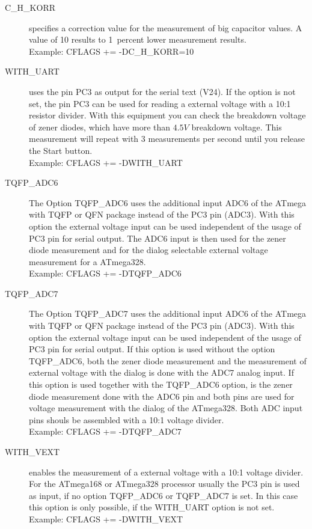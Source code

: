 \begin{description}
  \item[C\_H\_KORR] specifies a correction value for the measurement of big capacitor values.
A value of 10 results to 1~percent lower measurement results.\\
Example:  CFLAGS += -DC\_H\_KORR=10

  \item[WITH\_UART] uses the pin PC3 as output for the serial text (V24).
If the option is not set, the pin PC3 can be used for reading a external voltage with a 10:1 resistor divider.
With this equipment you can check the breakdown voltage of zener diodes, which have more than \(4.5V\) breakdown voltage.
This measurement will repeat with 3 measurements per second until you release the Start button.\\
Example: CFLAGS += -DWITH\_UART

  \item[TQFP\_ADC6] The Option TQFP\_ADC6 uses the additional input ADC6 of the ATmega with TQFP or QFN package instead of
the PC3 pin (ADC3).
With this option the external voltage input can be used independent of the usage of PC3 pin for serial output.
The ADC6 input is then used for the zener diode measurement and for the dialog selectable external voltage measurement
for a ATmega328.\\
Example: CFLAGS += -DTQFP\_ADC6

  \item[TQFP\_ADC7] The Option TQFP\_ADC7 uses the additional input ADC6 of the ATmega with TQFP or QFN package instead of
the PC3 pin (ADC3).
With this option the external voltage input can be used independent of the usage of PC3 pin for serial output.
If this option is used without the option TQFP\_ADC6, both the zener diode measurement and the measurement of external voltage
with the dialog is done with the ADC7 analog input.
If this option is used together with the TQFP\_ADC6 option, is the zener diode measurement done with the ADC6 pin and
both pins are used for voltage measurement with the dialog of the ATmega328.
Both ADC input pins shouls be assembled with a 10:1 voltage divider.\\
Example: CFLAGS += -DTQFP\_ADC7

  \item[WITH\_VEXT] enables the measurement of a external voltage with a 10:1 voltage divider.
For the ATmega168 or ATmega328 processor usually the PC3 pin is used as input, if no option TQFP\_ADC6 or
TQFP\_ADC7 is set. In this case this option is only possible, if the WITH\_UART option is not set.\\
Example: CFLAGS += -DWITH\_VEXT 


\end{description}
